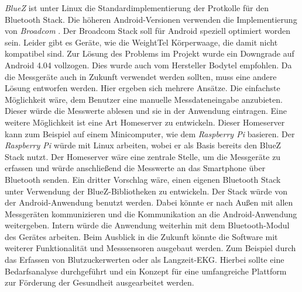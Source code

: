 \emph{BlueZ} ist unter Linux die Standardimplementierung der Protkolle f\"ur den Bluetooth Stack.  
Die h\"oheren Android-Versionen verwenden die Implementierung von \emph{Broadcom} \cite{Broadcom:01}.
Der Broadcom Stack soll f\"ur Android speziell optimiert worden sein.
Leider gibt es Ger\"ate, wie die WeightTel K\"orperwaage, die damit nicht kompatibel sind.
Zur L\"osung des Problems im Projekt wurde ein Downgrade auf Android 4.04 vollzogen.
Dies wurde auch vom Hersteller Bodytel empfohlen.
Da die Messger\"ate auch in Zukunft verwendet werden sollten, muss eine andere L\"osung entworfen werden.
Hier ergeben sich mehrere Ans\"atze.
Die einfachste M\"oglichkeit w\"are, dem Benutzer eine manuelle Messdateneingabe anzubieten.
Dieser w\"urde die Messwerte ablesen und sie in der Anwendung eintragen.
Eine weitere M\"oglichkeit ist eine Art Homeserver zu entwickeln.
Dieser Homeserver kann zum Beispiel auf einem Minicomputer, wie dem \emph{Raspberry Pi} \cite{rasppi:01} basieren.
Der \emph{Raspberry Pi} w\"urde mit Linux arbeiten, wobei er als Basis bereits den BlueZ Stack nutzt.
Der Homeserver w\"are eine zentrale Stelle, um die Messger\"ate zu erfassen 
und w\"urde anschlie\ss{}end die Messwerte an das Smartphone \"uber Bluetooth senden.
Ein dritter Vorschlag w\"are, einen eigenen Bluetooth Stack unter Verwendung der BlueZ-Bibliotheken zu entwickeln.
Der Stack w\"urde von der Android-Anwendung benutzt werden. Dabei k\"onnte er nach Au\ss{}en mit allen Messger\"aten
kommunizieren und die Kommunikation an die Android-Anwendung weitergeben.
Intern w\"urde die Anwendung weiterhin mit dem Bluetooth-Modul des Ger\"ates arbeiten.
Beim Ausblick in die Zukunft k\"onnte die Software mit weiterer Funktionalit\"at und Messsensoren ausgebaut werden.
Zum Beispiel durch das Erfassen von Blutzuckerwerten oder als Langzeit-EKG.
Hierbei sollte eine Bedarfsanalyse durchgef\"uhrt und ein Konzept f\"ur eine umfangreiche Plattform zur 
F\"orderung der Gesundheit ausgearbeitet werden.

